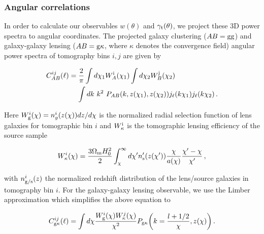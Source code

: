 \documentclass[aps, prd,twocolumn,superscriptaddress,nofootinbib,preprintnumbers]{revtex4-1}
\newcommand{\gammat}{\ensuremath{\gamma_{\rm t}(\theta)}}
\newcommand{\wtheta}{\ensuremath{w(\theta)}}
\newcommand{\xigg}{\ensuremath{\xi_{\mathrm{gg}}} }
\newcommand{\xigm}{\ensuremath{\xi_{\mathrm{gm}}} }
\begin{document}
\subsubsection{Angular correlations} \label{sec:proj_2pt}

In order to calculate our observables $\wtheta$ and $\gammat$, we project these 3D power spectra to angular coordinates. %
The projected galaxy clustering ($AB = \rm{gg}$) and galaxy-galaxy lensing ($AB={\rm g\kappa}$, where $\kappa$ denotes the convergence field) angular power spectra of tomography bins $i,j$ are given by
\begin{linenomath*}
\begin{align}\label{eq:Cl_exact}
    C^{ij}_{AB}(\ell) &= \frac{2}{\pi} \int d\chi_1 W^{\rm i}_{A}(\chi_1) \int d\chi_2 W^{\rm j}_{B}(\chi_2) \nonumber \\
    &\mathrel{\phantom{=}} \int dk \ k^2 \ P_{ AB}(k,z(\chi_1),z(\chi_2)) j_{\ell}(k \chi_1) j_{\ell}(k \chi_2)\,.
\end{align}
\end{linenomath*}
Here $W^{i}_{\rm g}(\chi) = n^{i}_g (z(\chi))dz/d\chi$ is the normalized radial selection function of lens galaxies for tomographic bin $i$ and $W^{\rm i}_{\kappa}$ is the tomographic lensing efficiency of the source sample
\begin{linenomath*}
\begin{equation}
    W^{i}_{\rm \kappa} (\chi)= \frac{3\Omega_{\rm m} H_0^2}{2} \int_{\chi}^{\infty} d\chi' n'_{\rm s} (z(\chi'))\frac{\chi}{a(\chi)}\frac{\chi' - \chi}{\chi'}\,,
\end{equation}
\end{linenomath*}
with $n_{\rm{g/s}}^i(z)$ the normalized redshift distribution of the lens/source galaxies in tomography bin $i$. 
For the galaxy-galaxy lensing observable, we use the Limber approximation \citep{Limber:53, LoVerde:2008re} which simplifies the above equation to
\begin{linenomath*}
\begin{equation}\label{eq:Cl_limber}
    C^{ij}_{\rm g\kappa}(\ell)  = \int d\chi \frac{W^{i}_{\rm g}(\chi) W^{j}_{\rm \kappa}(\chi)}{\chi^2} P_{\rm g\kappa}\bigg(k=\frac{l + 1/2}{\chi},z(\chi)\bigg)\,.
\end{equation}
\end{linenomath*}
\end{document}
